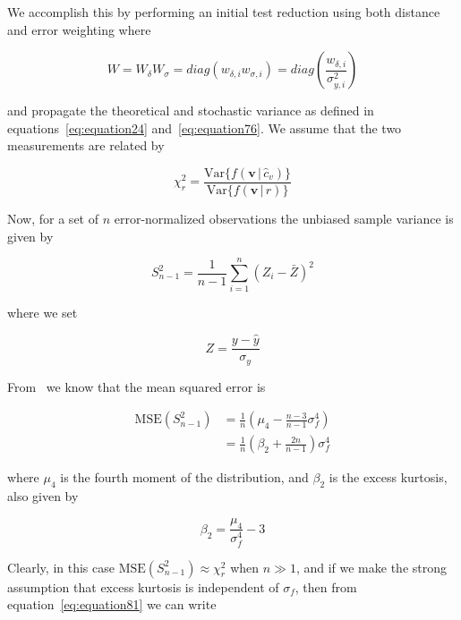We accomplish this by performing an initial test reduction using both distance
and error weighting where

\begin{equation}
    W = W_{\delta} W_{\sigma} = diag(w_{\delta, i} w_{\sigma, i}) =
        diag(\frac{w_{\delta, i}}{\sigma_{y, i}^2})
    \label{eq:equation27}
\end{equation}

and propagate the theoretical and stochastic variance as defined in
equations~\ref{eq:equation24} and~\ref{eq:equation76}.
We assume that the two measurements are related by

\begin{equation}
    \chi_r^2 = \frac{\text{Var} \{f(\bm{v}\, |\, \hat{c}_v) \}}
                    {\text{Var} \{f(\bm{v}\, |\, r)\}}
    \label{eq:equation26}
\end{equation}

Now, for a set of $n$ error-normalized observations the unbiased sample variance
is given by

\begin{equation}
    S_{n - 1}^{2} = \frac{1}{n - 1} \sum_{i=1}^{n}{(Z_i - \bar{Z})^2}
    \label{eq:equation28}
\end{equation}

where we set

\begin{equation}
    Z = \frac{y - \hat{y}}{\sigma_y}
    \label{eq:equation32}
\end{equation}

From~\citet{Mood1974} we know that the mean squared error is

\begin{align}
    \text{MSE}(S_{n-1}^{2}) &= \frac{1}{n}
        \left(\mu_4 - \frac{n-3}{n-1}\sigma_f^4
    \right) \nonumber \\
        &= \frac{1}{n}\left(\beta_2 + \frac{2n}{n-1}\right)\sigma_f^4
    \label{eq:equation81}
\end{align}

where $\mu_4$ is the fourth moment of the distribution, and $\beta_2$ is the
excess kurtosis, also given by

\begin{equation}
    \beta_2 = \frac{\mu_4}{\sigma_f^4} - 3
    \label{eq:equation84}
\end{equation}

Clearly, in this case $\text{MSE}(S_{n-1}^{2}) \approx \chi_r^2$ when
$n \gg 1$, and if we make the strong assumption that excess kurtosis is
independent of $\sigma_f$, then from equation~\ref{eq:equation81} we can write

